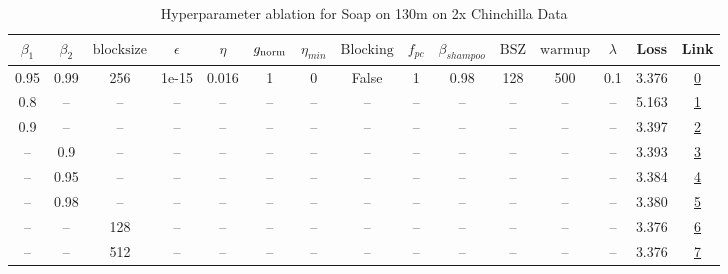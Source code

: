 \begin{table}[H]
\centering
\caption{Hyperparameter ablation for Soap on 130m on 2x Chinchilla Data}
\label{tab:ablation_soap_130m_on_2x_chinchilla_data}
\begin{tabular}{ccccccccccccccc}
\toprule
$\beta_1$ & $\beta_2$ & $\mathrm{block size}$ & $\epsilon$ & $\eta$ & $g_{\mathrm{norm}}$ & $\eta_{min}$ & $\mathrm{Blocking}$ & $f_{pc}$ & $\beta_{shampoo}$ & $\mathrm{BSZ}$ & $\mathrm{warmup}$ & $\lambda$ & Loss & Link \\
\midrule
0.95 & 0.99 & 256 & 1e-15 & 0.016 & 1 & 0 & False & 1 & 0.98 & 128 & 500 & 0.1 & 3.376 & \href{https://wandb.ai/marin-community/optimizer-scaling/runs/sweep-130m-5B-soap04fae1lr0.016-wd0.1-minlr0-warmup500-b10.95-b2-1074a6}{0} \\
\midrule
0.8 & -- & -- & -- & -- & -- & -- & -- & -- & -- & -- & -- & -- & 5.163 & \href{https://wandb.ai/marin-community/optimizer-scaling/runs/sweep-130m-5B-soap5ef8calr0.016-wd0.1-minlr0-warmup500-b10.8-b20-152142}{1} \\
0.9 & -- & -- & -- & -- & -- & -- & -- & -- & -- & -- & -- & -- & 3.397 & \href{https://wandb.ai/marin-community/optimizer-scaling/runs/sweep-130m-5B-soap0f87cclr0.016-wd0.1-minlr0-warmup500-b10.9-b20-a97c0f}{2} \\
-- & 0.9 & -- & -- & -- & -- & -- & -- & -- & -- & -- & -- & -- & 3.393 & \href{https://wandb.ai/marin-community/optimizer-scaling/runs/sweep-130m-5B-soap986b9dlr0.016-wd0.1-minlr0-warmup500-b10.95-b2-c68a63}{3} \\
-- & 0.95 & -- & -- & -- & -- & -- & -- & -- & -- & -- & -- & -- & 3.384 & \href{https://wandb.ai/marin-community/optimizer-scaling/runs/sweep-130m-5B-soapfe15e2lr0.016-wd0.1-minlr0-warmup500-b10.95-b2-3ad392}{4} \\
-- & 0.98 & -- & -- & -- & -- & -- & -- & -- & -- & -- & -- & -- & 3.380 & \href{https://wandb.ai/marin-community/optimizer-scaling/runs/sweep-130m-5B-soap7355b2lr0.016-wd0.1-minlr0-warmup500-b10.95-b2-5430b0}{5} \\
-- & -- & 128 & -- & -- & -- & -- & -- & -- & -- & -- & -- & -- & 3.376 & \href{https://wandb.ai/marin-community/optimizer-scaling/runs/sweep-130m-5B-soap961d04lr0.016-wd0.1-minlr0-warmup500-b10.95-b2-da762c}{6} \\
-- & -- & 512 & -- & -- & -- & -- & -- & -- & -- & -- & -- & -- & 3.376 & \href{https://wandb.ai/marin-community/optimizer-scaling/runs/sweep-130m-5B-soap95f45flr0.016-wd0.1-minlr0-warmup500-b10.95-b2-7e2136}{7} \\

\end{tabular}
\end{table}
